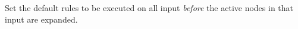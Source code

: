 
Set the default rules to be executed on all input \emph{before} the
active nodes in that input are expanded. 


